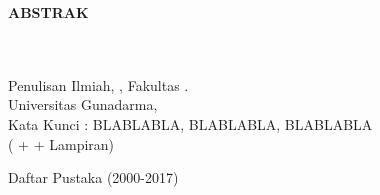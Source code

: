 \newpage
{}
\begin{center}
\begin{large}\textbf{ABSTRAK}\end{large}
\end{center}
\vspace{1cm} 
\namapenulis\hspace{1mm}\npmpenulis\\
\MakeTextUppercase{\textbf{\judul}}\\
Penulisan Ilmiah, \jurusanpenulis, Fakultas \fakultaspenulis.\\
Universitas Gunadarma, \tahunpembuatan\\
Kata Kunci : BLABLABLA, BLABLABLA, BLABLABLA
\\(\pageref{Daftar-Lampiran} + \pageref{Daftar-Pustaka} + Lampiran)
\begin{singlespace}
\noindent \lipsum[1-1]

\vspace{1cm}
\noindent Daftar Pustaka (2000-2017)  
\end{singlespace}

\newpage